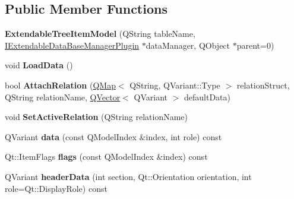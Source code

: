 \subsection*{Public Member Functions}
\begin{DoxyCompactItemize}
\item 
\mbox{\label{class_extendable_tree_item_model_a44c736cca0dde9d9ca5c295ebc85fdfe}} 
{\bfseries Extendable\+Tree\+Item\+Model} (Q\+String table\+Name, \hyperlink{class_i_extendable_data_base_manager_plugin}{I\+Extendable\+Data\+Base\+Manager\+Plugin} $\ast$data\+Manager, Q\+Object $\ast$parent=0)
\item 
\mbox{\label{class_extendable_tree_item_model_acb01ad7e561a6471b7361ea50fe84c01}} 
void {\bfseries Load\+Data} ()
\item 
\mbox{\label{class_extendable_tree_item_model_ac5899069b1919eaa044e729f8a19ef93}} 
bool {\bfseries Attach\+Relation} (\hyperlink{class_q_map}{Q\+Map}$<$ Q\+String, Q\+Variant\+::\+Type $>$ relation\+Struct, Q\+String relation\+Name, \hyperlink{class_q_vector}{Q\+Vector}$<$ Q\+Variant $>$ default\+Data)
\item 
\mbox{\label{class_extendable_tree_item_model_afdfd8ef7a227883e0d6b8916690ab383}} 
void {\bfseries Set\+Active\+Relation} (Q\+String relation\+Name)
\item 
\mbox{\label{class_extendable_tree_item_model_ac8c51c0f788968325e1db351bc0ada05}} 
Q\+Variant {\bfseries data} (const Q\+Model\+Index \&index, int role) const
\item 
\mbox{\label{class_extendable_tree_item_model_abcc48e9d0622ddc57bc7e41ab7495f83}} 
Qt\+::\+Item\+Flags {\bfseries flags} (const Q\+Model\+Index \&index) const
\item 
\mbox{\label{class_extendable_tree_item_model_a2b1773bbcde56b945dfa0c736ce9479b}} 
Q\+Variant {\bfseries header\+Data} (int section, Qt\+::\+Orientation orientation, int role=Qt\+::\+Display\+Role) const
\item 
\mbox{\label{class_extendable_tree_item_model_a132604ce666f168bef3813cb56f877e6}} 

\end{DoxyCompactItemize}
